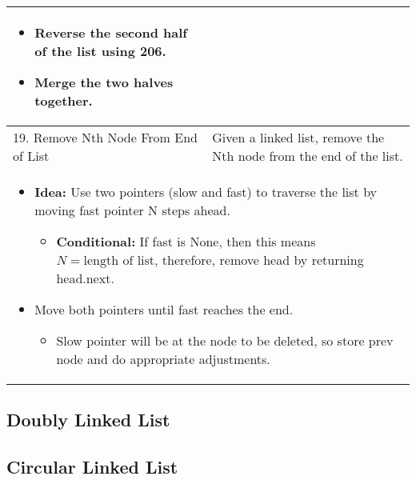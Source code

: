 \begin{summary}
\begin{center}
\begin{tabular}{ll}
{\begin{itemize}
                        \item Reverse the second half of the list using 206. 
                        \item Merge the two halves together.
                    \end{itemize}
                } \\
                \midrule 
                19. Remove Nth Node From End of List & Given a linked list, remove the Nth node from the end of the list. \\
                \multicolumn{2}{p{\linewidth}}{
                    \begin{itemize}
                        \item \textbf{Idea:} Use two pointers (slow and fast) to traverse the list by moving fast pointer N steps ahead. 
                        \begin{itemize}
                            \item \textbf{Conditional:} If fast is None, then this means $N=\text{length of list}$, therefore, remove head by returning head.next.
                        \end{itemize}
                        \item Move both pointers until fast reaches the end. 
                        \begin{itemize}
                            \item Slow pointer will be at the node to be deleted, so store prev node and do appropriate adjustments. 
                        \end{itemize}
                    \end{itemize}
                } \\
                \midrule
            \bottomrule
        \end{tabular}
    \end{center}
\end{summary}

\subsection{Doubly Linked List}
\begin{algo}

\end{algo}

\subsection{Circular Linked List}
\begin{algo}

\end{algo}
\newpage 
